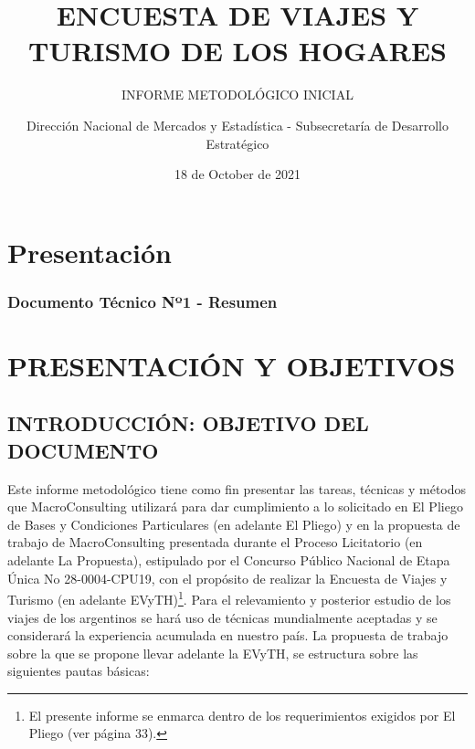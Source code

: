 \documentclass[
  openany]{book}
\title{ENCUESTA DE VIAJES Y TURISMO DE LOS HOGARES}
\subtitle{INFORME METODOLÓGICO INICIAL}
\author{Dirección Nacional de Mercados y Estadística - Subsecretaría de Desarrollo Estratégico}
\date{18 de October de 2021}
\let\oldmaketitle\maketitle
\begin{document}
\maketitle


\newpage

\let\maketitle\oldmaketitle
\maketitle

{
\setcounter{tocdepth}{1}
\tableofcontents
}
\hypertarget{presentaciuxf3n}{%
\chapter*{Presentación}\label{presentaciuxf3n}}

\hypertarget{documento-tuxe9cnico-nuxba1---resumen}{%
\subsection*{Documento Técnico Nº1 - Resumen}\label{documento-tuxe9cnico-nuxba1---resumen}}

\hypertarget{flujo-turistico}{%
\chapter{\texorpdfstring{\textbf{PRESENTACIÓN Y OBJETIVOS}}{PRESENTACIÓN Y OBJETIVOS}}\label{flujo-turistico}}

\hypertarget{introducciuxf3n-objetivo-del-documento}{%
\section{\texorpdfstring{\textbf{INTRODUCCIÓN: OBJETIVO DEL DOCUMENTO}}{INTRODUCCIÓN: OBJETIVO DEL DOCUMENTO}}\label{introducciuxf3n-objetivo-del-documento}}

Este informe metodológico tiene como fin presentar las tareas, técnicas
y métodos que MacroConsulting utilizará para dar cumplimiento a lo
solicitado en El Pliego de Bases y Condiciones Particulares (en adelante
El Pliego) y en la propuesta de trabajo de MacroConsulting presentada
durante el Proceso Licitatorio (en adelante La Propuesta), estipulado
por el Concurso Público Nacional de Etapa Única No 28-0004-CPU19, con el
propósito de realizar la Encuesta de Viajes y Turismo (en adelante
EVyTH)\footnote{El presente informe se enmarca dentro de los
  requerimientos exigidos por El Pliego (ver página 33).}. Para el relevamiento y posterior estudio de los
viajes de los argentinos se hará uso de técnicas mundialmente aceptadas
y se considerará la experiencia acumulada en nuestro país. La propuesta
de trabajo sobre la que se propone llevar adelante la EVyTH, se
estructura sobre las siguientes pautas básicas:
\end{document}
